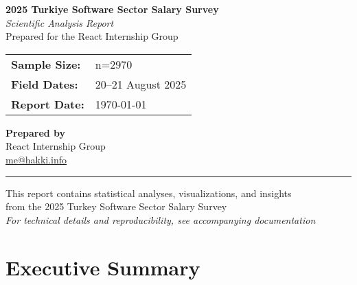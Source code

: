 \documentclass[a4paper,12pt]{article}
\makeatletter
\newcommand{\ProjectTitle}{2025 Turkiye Software Sector Salary Survey}
\newcommand{\SampleSize}{n=2970}
\newcommand{\SurveyDates}{20--21 August 2025}
\newcommand{\AuthorTeam}{React Internship Group}
\newcommand{\ContactEmail}{me@hakki.info}
\makeatother
\begin{document}
\begin{titlepage}
  \centering
  \vspace*{2cm}
  
  {\Huge \textbf{\ProjectTitle}}\\[1.5cm]
  
  {\Large \textit{Scientific Analysis Report}}\\[0.8cm]
  {\large Prepared for the React Internship Group}\\[1.2cm]
  
  \begin{center}
    \begin{tabular}{ll}
      \textbf{Sample Size:} & \SampleSize{} \\
      \textbf{Field Dates:} & \SurveyDates{} \\
      \textbf{Report Date:} & \today
    \end{tabular}
  \end{center}
  
  \vfill
  
  \begin{center}
    \textbf{\large Prepared by}\\[0.5cm]
    {\Large \AuthorTeam}\\[0.3cm]
    \href{mailto:\ContactEmail}{\ContactEmail}\\[0.5cm]
    \vspace{0.5cm}
    \rule{0.4\textwidth}{0.4pt}
  \end{center}
  
  \vfill
  
  {\small 
    This report contains statistical analyses, visualizations, and insights\\
    from the 2025 Turkey Software Sector Salary Survey\\
    \vspace{0.3cm}
    \textit{For technical details and reproducibility, see accompanying documentation}
  }
  
  \vspace{1cm}
\end{titlepage}

\tableofcontents
\listoffigures
\listoftables
\clearpage
{}

\section*{Executive Summary}

\end{document}
